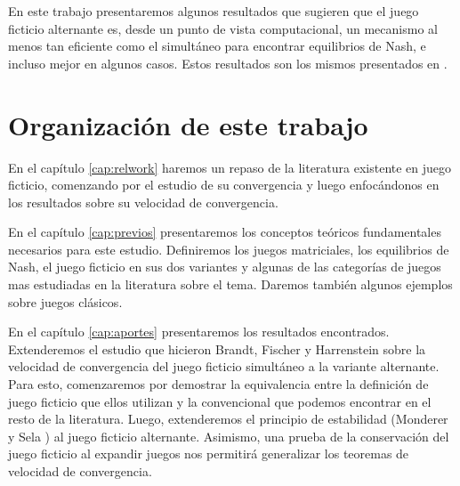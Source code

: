 En este trabajo presentaremos algunos resultados que sugieren que el juego ficticio alternante es, desde un punto de vista computacional, un mecanismo al menos tan eficiente como el simultáneo para encontrar equilibrios de Nash, e incluso mejor en algunos casos. Estos resultados son los mismos presentados en \cite{arbiser:badaloni}.



\section{Organización de este trabajo}

 En el capítulo \ref{cap:relwork} haremos un repaso de la literatura existente en juego ficticio, comenzando por el estudio de su convergencia y luego enfocándonos en los resultados sobre su velocidad de convergencia. 
 
 En el capítulo \ref{cap:previos} presentaremos los conceptos teóricos fundamentales necesarios para este estudio. Definiremos los juegos matriciales, los equilibrios de Nash, el juego ficticio en sus dos variantes y algunas de las categorías de juegos mas estudiadas en la literatura sobre el tema. Daremos también algunos ejemplos sobre juegos clásicos.

 En el capítulo \ref{cap:aportes} presentaremos los resultados encontrados. Extenderemos el estudio que hicieron Brandt, Fischer y Harrenstein \cite{brandt:rate:convergence} sobre la velocidad de convergencia del juego ficticio simultáneo a la variante alternante. Para esto, comenzaremos por demostrar la equivalencia entre la definición de juego ficticio que ellos utilizan y la convencional que podemos encontrar en el resto de la literatura. Luego, extenderemos el principio de estabilidad (Monderer y Sela \cite{no:cycling}) al juego ficticio alternante. Asimismo, una prueba de la conservación del juego ficticio al expandir juegos nos permitirá generalizar los teoremas de velocidad de convergencia.